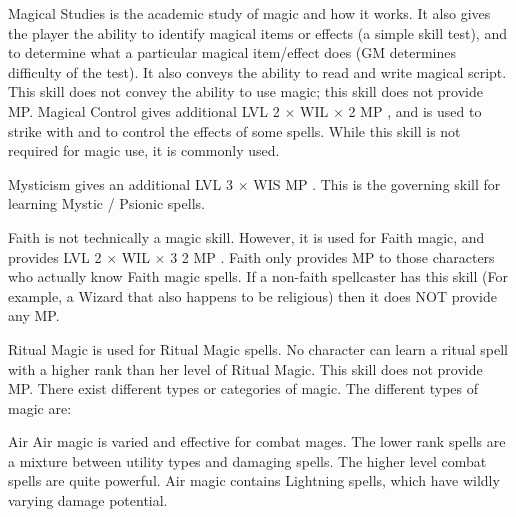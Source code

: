 \documentclass[twoside]{book}
\begin{document}
                  Magical Studies is the academic study of magic
                 and how it works. It also gives the player the ability
                 to identify magical items or effects (a simple skill
                 test), and to determine what a particular magical
                 item/effect does (GM determines difficulty of the test).
                 It also conveys the ability to read and write magical
                 script. This skill does not convey the ability to use
                 magic; this skill does not provide MP. 
                Magical Control gives additional     
                       LVL  2   
                        \ensuremath{\times}    WIL   
                      \ensuremath{\times}    2    MP   
                        , and is used to strike with and to control
                      the effects of some spells. While this skill is not
                      required for magic use, it is commonly used.
                
                Mysticism gives an additional     
                       LVL    3   
                        \ensuremath{\times}    WIS    MP
                           . This is the governing skill
                      for learning Mystic / Psionic spells.
                
                  Faith is not technically a magic skill. However,
                 it is used for Faith magic, and provides   
                       LVL    2   
                        \ensuremath{\times}    WIL   
                      \ensuremath{\times}    3  2
                         MP      . Faith
                      only provides MP to those characters who actually
                      know Faith magic spells. If a non-faith spellcaster
                      has this skill (For example, a Wizard that also
                      happens to be religious) then it does NOT provide
                      any MP.
                
                  Ritual Magic is used for Ritual Magic spells. No
                 character can learn a ritual spell with a higher rank
                 than her level of Ritual Magic. This skill does not
                 provide MP. 
              There exist different types or categories of magic.
               The different types of magic are:   
              
                  Air   Air magic is varied
                  and effective for combat mages. The lower rank spells
                  are a mixture between utility types and damaging
                  spells. The higher level combat spells are quite
                  powerful. Air magic contains Lightning spells, which
                  have wildly varying damage potential.
                
\end{document}
